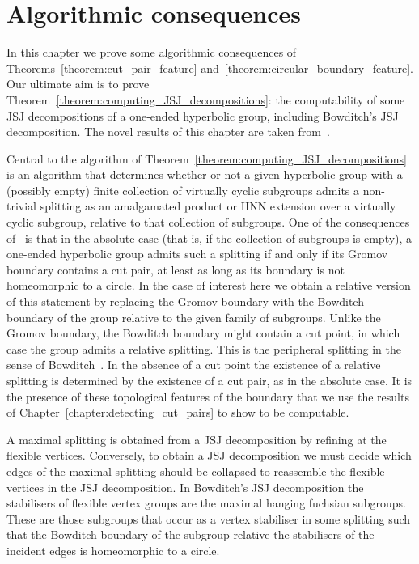 \chapter{Algorithmic consequences}\label{chapter:computing_JSJs}

In this chapter we prove some algorithmic consequences of Theorems~\ref{theorem:cut_pair_feature} and~\ref{theorem:circular_boundary_feature}.
Our ultimate aim is to prove Theorem~\ref{theorem:computing_JSJ_decompositions}: the computability of some JSJ decompositions of a one-ended hyperbolic group, including Bowditch's JSJ decomposition.
The novel results of this chapter are taken from~\cite[Sections 3--5]{barrett18}.

Central to the algorithm of Theorem~\ref{theorem:computing_JSJ_decompositions} is an algorithm that determines whether or not a given hyperbolic group with a (possibly empty) finite collection of virtually cyclic subgroups admits a non-trivial splitting as an amalgamated product or HNN extension over a virtually cyclic subgroup, relative to that collection of subgroups. 
One of the consequences of~\cite{bowditch98} is that in the absolute case (that is, if the collection of subgroups is empty), a one-ended hyperbolic group admits such a splitting if and only if its Gromov boundary contains a cut pair, at least as long as its boundary is not homeomorphic to a circle. 
In the case of interest here we obtain a relative version of this statement by replacing the Gromov boundary with the Bowditch boundary of the group relative to the given family of subgroups. 
Unlike the Gromov boundary, the Bowditch boundary might contain a cut point, in which case the group admits a relative splitting. 
This is the peripheral splitting in the sense of Bowditch~\cite{bowditch99b}. 
In the absence of a cut point the existence of a relative splitting is determined by the existence of a cut pair, as in the absolute case. 
It is the presence of these topological features of the boundary that we use the results of Chapter~\ref{chapter:detecting_cut_pairs} to show to be computable.

A maximal splitting is obtained from a JSJ decomposition by refining at the flexible vertices. 
Conversely, to obtain a JSJ decomposition we must decide which edges of the maximal splitting should be collapsed to reassemble the flexible vertices in the JSJ decomposition. 
In Bowditch's JSJ decomposition the stabilisers of flexible vertex groups are the maximal hanging fuchsian subgroups. 
These are those subgroups that occur as a vertex stabiliser in some splitting such that the Bowditch boundary of the subgroup relative the stabilisers of the incident edges is homeomorphic to a circle. 

